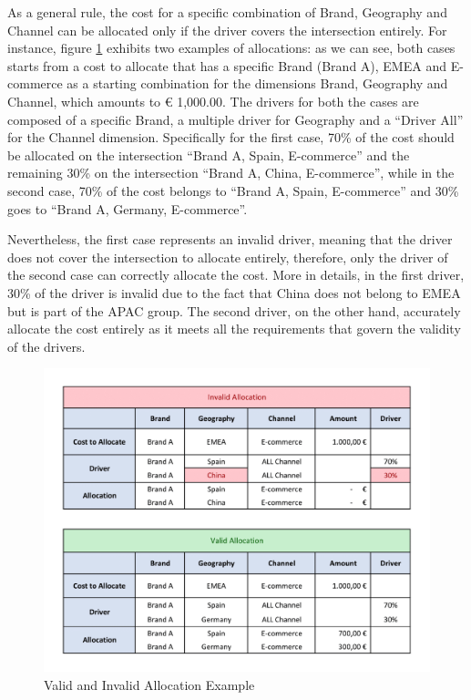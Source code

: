 \documentclass[12pt,a4paper,openright,twoside]{book}
\begin{document}
As a general rule, the cost for a specific combination of Brand, Geography and Channel can be allocated only if the driver covers the intersection entirely.
%
For instance, figure \ref{fig:allocation} exhibits two examples of allocations: as we can see, both cases starts from a cost to allocate that has a specific Brand (Brand A), EMEA and E-commerce as a starting combination for the dimensions Brand, Geography and Channel, which amounts to € 1,000.00.
%
The drivers for both the cases are composed of a specific Brand, a multiple driver for Geography and a ``Driver All'' for the Channel dimension.
%
Specifically for the first case, 70\% of the cost should be allocated on the intersection ``Brand A, Spain, E-commerce'' and the remaining 30\% on the intersection ``Brand A, China, E-commerce'', while in the second case, 70\% of the cost belongs to ``Brand A, Spain, E-commerce'' and 30\% goes to ``Brand A, Germany, E-commerce''.

Nevertheless, the first case represents an invalid driver, meaning that the driver does not cover the intersection to allocate entirely, therefore, only the driver of the second case can correctly allocate the cost.
%
More in details, in the first driver, 30\% of the driver is invalid due to the fact that China does not belong to EMEA but is part of the APAC group.
%
The second driver, on the other hand, accurately allocate the cost entirely as it meets all the requirements that govern the validity of the drivers.

\begin{figure}[ht]
	\centering
	\includegraphics[width=\linewidth]{figures/allocation.pdf}
	\caption{Valid and Invalid Allocation Example}
	\label{fig:allocation}
\end{figure}
\end{document}
